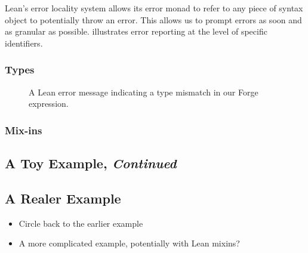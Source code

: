 Lean's error locality system allows its error monad to refer to any piece of syntax object to potentially throw an error. This allows us to prompt errors as soon and as granular as possible.  illustrates error reporting at the level of specific identifiers. 

\subsubsection{Types}


\begin{figure}
  \centering
  \caption{A Lean error message indicating a type mismatch in our Forge expression.}
  \label{fig:sc-type-mismatch}
\end{figure}

\subsubsection{Mix-ins}

\subsection{A Toy Example, \emph{Continued}}

\subsection{A Realer Example}

\begin{itemize}
  \item Circle back to the earlier example
  \item A more complicated example, potentially with Lean mixins?
\end{itemize}
